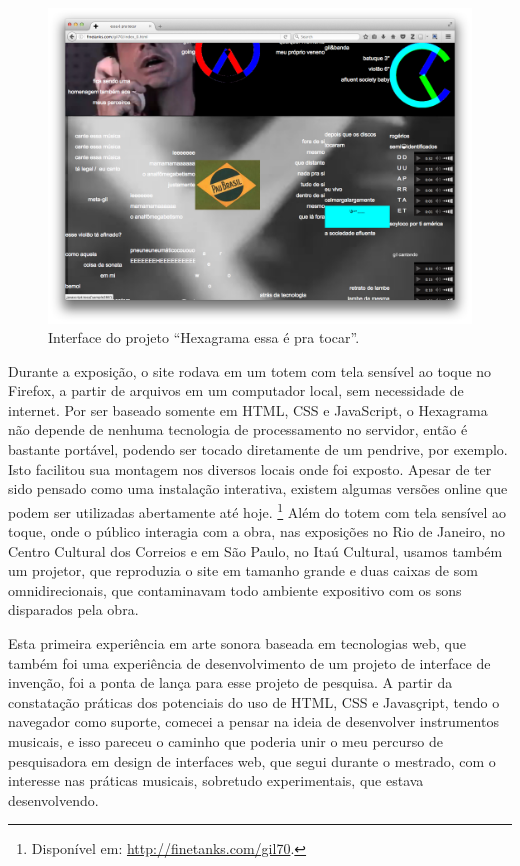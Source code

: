 \begin{figure}
\centering
\includegraphics[width=1\textwidth]{pictures/cap1/gil702}
\caption{Interface do projeto ``Hexagrama essa é pra tocar''.}
\label{fig:gil702}
\end{figure}

Durante a exposição, o site rodava em um totem com tela sensível ao toque no Firefox, a partir de arquivos em um computador local, sem necessidade de internet. Por ser baseado somente em HTML, CSS e JavaScript, o Hexagrama não depende de nenhuma tecnologia de processamento no servidor, então é bastante portável, podendo ser tocado diretamente de um pendrive, por exemplo. Isto facilitou sua montagem nos diversos locais onde foi exposto. Apesar de ter sido pensado como uma instalação interativa, existem algumas versões online que podem ser utilizadas abertamente até hoje. \footnote{Disponível em: \url{http://finetanks.com/gil70}.}
Além do totem com tela sensível ao toque, onde o público interagia com a obra, nas exposições no Rio de Janeiro, no Centro Cultural dos Correios e em São Paulo, no Itaú Cultural, usamos também um projetor, que reproduzia o site em tamanho grande e duas caixas de som omnidirecionais, que contaminavam todo ambiente expositivo com os sons disparados pela obra.

Esta primeira experiência em arte sonora baseada em tecnologias web, que também foi uma experiência de desenvolvimento de um projeto de interface de invenção, foi a ponta de lança para esse projeto de pesquisa. A partir da constatação práticas dos potenciais do uso de HTML, CSS e Javasçript, tendo o navegador como suporte, comecei a pensar na ideia de desenvolver instrumentos musicais, e isso pareceu o caminho que poderia unir o meu percurso de pesquisadora em design de interfaces web, que segui durante o mestrado, com o interesse nas práticas musicais, sobretudo experimentais, que estava desenvolvendo.


\newpage